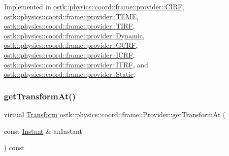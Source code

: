 Implemented in \hyperlink{classostk_1_1physics_1_1coord_1_1frame_1_1provider_1_1_c_i_r_f_a9c7c1e79785b676501e6a4686389a425}{ostk\+::physics\+::coord\+::frame\+::provider\+::\+C\+I\+RF}, \hyperlink{classostk_1_1physics_1_1coord_1_1frame_1_1provider_1_1_t_e_m_e_a10031d843340adafe7d9f4a3a0a4f86c}{ostk\+::physics\+::coord\+::frame\+::provider\+::\+T\+E\+ME}, \hyperlink{classostk_1_1physics_1_1coord_1_1frame_1_1provider_1_1_t_i_r_f_ae29e3db5bd1bccbc69a507f8716b73e5}{ostk\+::physics\+::coord\+::frame\+::provider\+::\+T\+I\+RF}, \hyperlink{classostk_1_1physics_1_1coord_1_1frame_1_1provider_1_1_dynamic_a37623142581671606ea45ca3bda0d0c8}{ostk\+::physics\+::coord\+::frame\+::provider\+::\+Dynamic}, \hyperlink{classostk_1_1physics_1_1coord_1_1frame_1_1provider_1_1_g_c_r_f_a71f14cba2d0d20a5bbeaa3b4fb08a79a}{ostk\+::physics\+::coord\+::frame\+::provider\+::\+G\+C\+RF}, \hyperlink{classostk_1_1physics_1_1coord_1_1frame_1_1provider_1_1_i_c_r_f_a40f7812d39719db68178ab6850a5cdde}{ostk\+::physics\+::coord\+::frame\+::provider\+::\+I\+C\+RF}, \hyperlink{classostk_1_1physics_1_1coord_1_1frame_1_1provider_1_1_i_t_r_f_aad7e29329b68f264bed571bf48b902a4}{ostk\+::physics\+::coord\+::frame\+::provider\+::\+I\+T\+RF}, and \hyperlink{classostk_1_1physics_1_1coord_1_1frame_1_1provider_1_1_static_a3e25a6fc979fc4ac28d8cbea4835ea71}{ostk\+::physics\+::coord\+::frame\+::provider\+::\+Static}.

\mbox{\label{classostk_1_1physics_1_1coord_1_1frame_1_1_provider_a38b86a589f46f8b8a9c97ab2776f37d1}} 
\subsubsection{\texorpdfstring{get\+Transform\+At()}{getTransformAt()}}
{\footnotesize\ttfamily virtual \hyperlink{classostk_1_1physics_1_1coord_1_1_transform}{Transform} ostk\+::physics\+::coord\+::frame\+::\+Provider\+::get\+Transform\+At (\begin{DoxyParamCaption}\item[{const \hyperlink{classostk_1_1physics_1_1time_1_1_instant}{Instant} \&}]{an\+Instant }\end{DoxyParamCaption}) const\hspace{0.3cm}{\ttfamily [pure virtual]}}



